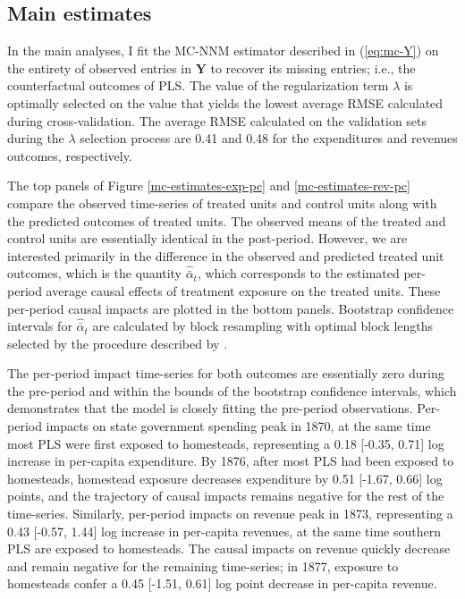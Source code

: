 \documentclass[12pt]{article}
\begin{document}
\subsection{Main estimates} \label{main-estimates}

In the main analyses, I fit the MC-NNM estimator described in (\ref{eq:mc-Y}) on the entirety of observed entries in $\mathbf{Y}$ to recover its missing entries; i.e., the counterfactual outcomes of PLS. The value of the regularization term $\lambda$ is optimally selected on the value that yields the lowest average RMSE calculated during cross-validation. The average RMSE calculated on the validation sets during the $\lambda$ selection process are 0.41 and 0.48 for the expenditures and revenues outcomes, respectively. 

The top panels of Figure \ref{mc-estimates-exp-pc} and \ref{mc-estimates-rev-pc} compare the observed time-series of treated units and control units along with the predicted outcomes of treated units. The observed means of the treated and control units are essentially identical in the post-period. However, we are interested primarily in the difference in the observed and predicted treated unit outcomes, which is the quantity $\hat{\bar{\alpha}}_{t}$, which corresponds to the estimated per-period average causal effects of treatment exposure on the treated units. These per-period causal impacts are plotted in the bottom panels. Bootstrap confidence intervals for $\hat{\bar{\alpha}}_{t}$ are calculated by block resampling with optimal block lengths selected by the procedure described by \citet{politis2004automatic}. 

The per-period impact time-series for both outcomes are essentially zero during the pre-period and within the bounds of the bootstrap confidence intervals, which demonstrates that the model is closely fitting the pre-period observations. Per-period impacts on state government spending peak in 1870, at the same time most PLS were first exposed to homesteads, representing a 0.18 [-0.35, 0.71] log increase in per-capita expenditure. By 1876, after most PLS had been exposed to homesteads, homestead exposure decreases expenditure by 0.51 [-1.67, 0.66] log points, and the trajectory of causal impacts remains negative for the rest of the time-series. Similarly, per-period impacts on revenue peak in 1873, representing a 0.43 [-0.57, 1.44] log increase in per-capita revenues, at the same time southern PLS are exposed to homesteads. The causal impacts on revenue quickly decrease and remain negative for the remaining time-series; in 1877, exposure to homesteads confer a 0.45 [-1.51, 0.61] log point decrease in per-capita revenue. 
\end{document}
